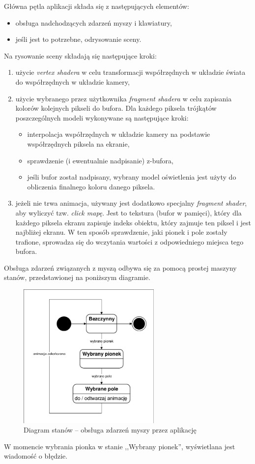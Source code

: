 \documentclass[10pt,a4paper]{article}
\begin{document}
Główna pętla aplikacji składa się z następujących elementów:
\begin{itemize}
	\item obsługa nadchodzących zdarzeń myszy i klawiatury,
	\item jeśli jest to potrzebne, odrysowanie sceny.
\end{itemize}
Na rysowanie sceny składają się następujące kroki:
\begin{enumerate}
	\item użycie \emph{vertex shadera} w celu transformacji współrzędnych w układzie świata do współrzędnych w układzie kamery,
	\item użycie wybranego przez użytkownika \emph{fragment shadera} w celu zapisania kolorów kolejnych pikseli do bufora. Dla każdego piksela trójkątów poszczególnych modeli wykonywane są następujące kroki:
	\begin{itemize}
		\item interpolacja współrzędnych w układzie kamery na podstawie współrzędnych piksela na ekranie,
		\item sprawdzenie (i ewentualnie nadpisanie) z-bufora,
		\item jeśli bufor został nadpisany, wybrany model oświetlenia jest użyty do obliczenia finalnego koloru danego piksela. 
	\end{itemize}
	\item jeżeli nie trwa animacja, używany jest dodatkowo specjalny \emph{fragment shader}, aby wyliczyć tzw. \emph{click mapę}. Jest to tekstura (bufor w pamięci), który dla każdego piksela ekranu zapisuje indeks obiektu, który zajmuje ten piksel i jest najbliżej ekranu. W ten sposób sprawdzenie, jaki pionek i pole zostały trafione, sprowadza się do wczytania wartości z odpowiedniego miejsca tego bufora. 
\end{enumerate}

Obsługa zdarzeń związanych z myszą odbywa się za pomocą prostej maszyny stanów, przedstawionej na poniższym diagramie.
\begin{figure}[H]
	\centering
	\includegraphics[width=7cm]{window-state.pdf}
	\caption{Diagram stanów -- obsługa zdarzeń myszy przez aplikację}
\end{figure}
W momencie wybrania pionka w stanie ,,Wybrany pionek'', wyświetlana jest wiadomość o błędzie.
\end{document}
